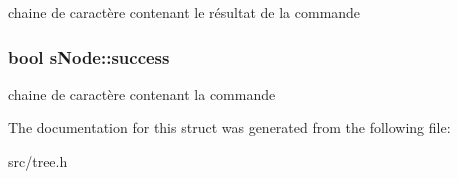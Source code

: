 chaine de caractère contenant le résultat de la commande \hypertarget{structsNode_ad3ce64c185ce2fb0da1625cc6bce9803}{
\subsubsection[{success}]{\setlength{\rightskip}{0pt plus 5cm}bool s\-Node\-::success}}\label{structsNode_ad3ce64c185ce2fb0da1625cc6bce9803}
chaine de caractère contenant la commande 

The documentation for this struct was generated from the following file\-:\begin{DoxyCompactItemize}
\item 
src/tree.\-h\end{DoxyCompactItemize}
